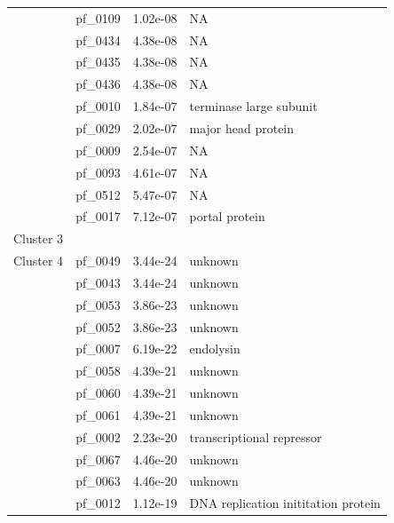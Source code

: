 \begin{table}
\begin{lrbox}{\leftbox}
\begin{tabular}[t]{llll}
                                        & pf\_0109 & 1.02e-08 & NA \\ 
                                        & pf\_0434 & 4.38e-08 & NA \\ 
                                        & pf\_0435 & 4.38e-08 & NA \\ 
                                        & pf\_0436 & 4.38e-08 & NA \\ 
                                        & pf\_0010 & 1.84e-07 & terminase large subunit \\ 
                                        & pf\_0029 & 2.02e-07 & major head protein \\ 
                                        & pf\_0009 & 2.54e-07 & NA \\ 
                                        & pf\_0093 & 4.61e-07 & NA \\ 
                                        & pf\_0512 & 5.47e-07 & NA \\ 
                                        & pf\_0017 & 7.12e-07 & portal protein \\ 
            \midrule
            Cluster 3 & & & \\
            \midrule
            \multirow{1}{*}{Cluster 4} & pf\_0049 & 3.44e-24 & unknown \\ 
                                        & pf\_0043 & 3.44e-24 & unknown \\ 
                                        & pf\_0053 & 3.86e-23 & unknown \\ 
                                        & pf\_0052 & 3.86e-23 & unknown \\ 
                                        & pf\_0007 & 6.19e-22 & endolysin \\ 
                                        & pf\_0058 & 4.39e-21 & unknown \\ 
                                        & pf\_0060 & 4.39e-21 & unknown \\ 
                                        & pf\_0061 & 4.39e-21 & unknown \\ 
                                        & pf\_0002 & 2.23e-20 & transcriptional repressor \\ 
                                        & pf\_0067 & 4.46e-20 & unknown \\ 
                                        & pf\_0063 & 4.46e-20 & unknown \\ 
                                        & pf\_0012 & 1.12e-19 & DNA replication inititation protein \\ 

\end{tabular}
\end{lrbox}
\end{table}
